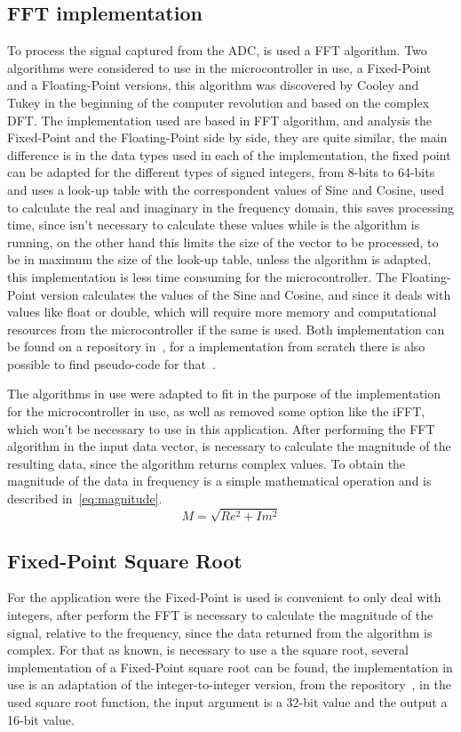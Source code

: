 \subsection{FFT implementation}\label{subsec:fftImp}
To process the signal captured from the ADC, is used a FFT algorithm. Two algorithms were considered to use in the microcontroller in use, a Fixed-Point and a Floating-Point versions, this algorithm was discovered by Cooley and Tukey in the beginning of the computer revolution and based on the complex DFT. The implementation used are based in FFT algorithm, and analysis the Fixed-Point and the Floating-Point side by side, they are quite similar, the main difference is in the data types used in each of the implementation, the fixed point can be adapted for the different types of signed integers, from 8-bits to 64-bits and uses a look-up table with the correspondent values of Sine and Cosine, used to calculate the real and imaginary in the frequency domain, this saves processing time, since isn't necessary to calculate these values while is the algorithm is running, on the other hand this limits the size of the vector to be processed, to be in maximum the size of the look-up table, unless the algorithm is adapted, this implementation is less time consuming for the microcontroller. The Floating-Point version calculates the values of the Sine and Cosine, and since it deals with values like float or double, which will require more memory and computational resources from the microcontroller if the same is used. Both implementation can be found on a repository in~\cite{262588213843476FixFft,Dannyf00FloatingPointFFTBenchmarka}, for a implementation from scratch there is also possible to find pseudo-code for that~\cite{smith1997scientist}.

The algorithms in use were adapted to fit in the purpose of the implementation for the microcontroller in use, as well as removed some option like the iFFT, which won't be necessary to use in this application.
After performing the FFT algorithm in the input data vector, is necessary to calculate the magnitude of the resulting data, since the algorithm returns complex values. To obtain the magnitude of the data in frequency is a simple mathematical operation and is described in~\ref{eq:magnitude}.
\begin{equation}\label{eq:magnitude}
    M = \sqrt{Re^2 + Im^2}
\end{equation}
\subsection{Fixed-Point Square Root}
For the application were the Fixed-Point is used is convenient to only deal with integers, after perform the FFT is necessary to calculate the magnitude of the signal, relative to the frequency, since the data returned from the algorithm is complex. For that as known, is necessary to use a the square root, several implementation of a Fixed-Point square root can be found, the implementation in use is an adaptation of the integer-to-integer version, from the repository~\cite{ChmikeFpsqrta}, in the used square root function, the input argument is a 32-bit value and the output a 16-bit value.

